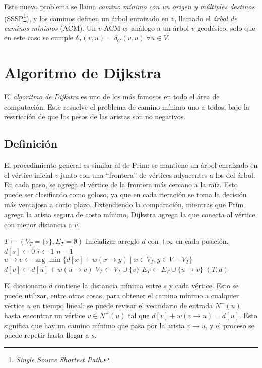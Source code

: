 Este nuevo problema se llama \textit{camino mínimo con un origen y múltiples destinos} (SSSP\footnote{\textit{Single Source Shortest Path.}}), y los caminos definen un árbol enraizado en $v$, llamado el \textit{árbol de caminos mínimos} (ACM). Un $v$-ACM es análogo a un árbol $v$-geodésico, solo que en este caso se cumple $\delta_T(v, u) = \delta_G(v, u)\ \forall u \in V$.

\section{Algoritmo de Dijkstra}

El \textit{algoritmo de Dijkstra} es uno de los más famosos en todo el área de computación. Este resuelve el problema de camino mínimo uno a todos, bajo la restricción de que los pesos de las aristas son no negativos.

\subsection{Definición}

El procedimiento general es similar al de Prim: se mantiene un árbol enraizado en el vértice inicial $v$ junto con una ``frontera'' de vértices adyacentes a los del árbol. En cada paso, se agrega el vértice de la frontera más cercano a la raíz. Esto puede ser clasificado como goloso, ya que en cada iteración se toma la decisión más ventajosa a corto plazo. Extendiendo la comparación, mientras que Prim agrega la arista segura de costo mínimo, Dijkstra agrega la que conecta al vértice con menor distancia a $v$.

\begin{codebox}
    \li $T \gets (V_T = \{s\}, E_T = \emptyset)$
    \li Inicializar arreglo $d$ con $+\infty$ en cada posición.
    \li $d[s] \gets 0$
    \li \For $i \gets 1$ \To $n - 1$ \Do
    \li $u \rightarrow v \gets \arg\min{\{d[x] + w(x \rightarrow y) \mid x \in V_T, y \in V - V_T\}}$
    \li $d[v] \gets d[u] + w(u \rightarrow v)$
    \li $V_T \gets V_T \cup \{v\}$
    \li $E_T \gets E_T \cup \{u \rightarrow v\}$
    \End
    \li \Return $(T, d)$
\end{codebox}

El diccionario $d$ contiene la distancia mínima entre $s$ y cada vértice. Esto se puede utilizar, entre otras cosas, para obtener el camino mínimo a cualquier vértice $u$ en tiempo lineal: se puede revisar el vecindario de entrada $N^-(u)$ hasta encontrar un vértice $v \in N^-(u)$ tal que $d[v] + w(v \rightarrow u) = d[u]$. Esto significa que hay un camino mínimo que pasa por la arista $v \rightarrow u$, y el proceso se puede repetir hasta llegar a $s$.

